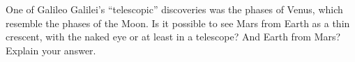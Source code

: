 One of Galileo Galilei's ``telescopic'' discoveries was the phases of Venus,
which resemble the phases of the Moon. Is it possible to see Mars from Earth
as a thin crescent, with the naked eye or at least in a telescope? And Earth
from Mars? Explain your answer.
